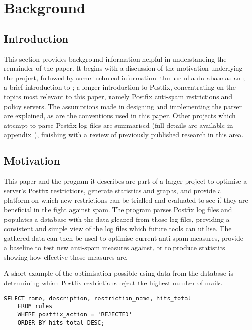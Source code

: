 \section{Background}

\label{background}

\subsection{Introduction}

This section provides background information helpful in understanding the
remainder of the paper.  It begins with a discussion of the motivation
underlying the project, followed by some technical information: the use of
a database as an \API{}\@; a brief introduction to \SMTP{}\@; a longer
introduction to Postfix, concentrating on the topics most relevant to this
paper, namely Postfix anti-spam restrictions and policy servers.  The
assumptions made in designing and implementing the parser are explained, as
are the conventions used in this paper.  Other projects which attempt to
parse Postfix log files are summarised (full details are available in
appendix~), finishing with a review of
previously published research in this area.

\subsection{Motivation}

\label{motivation}

This paper and the program it describes are part of a larger project to
optimise a server's Postfix restrictions, generate statistics and graphs,
and provide a platform on which new restrictions can be trialled and
evaluated to see if they are beneficial in the fight against spam.  The
program parses Postfix log files and populates a database with the data
gleaned from those log files, providing a consistent and simple view of the
log files which future tools can utilise.  The gathered data can then be
used to optimise current anti-spam measures, provide a baseline to test new
anti-spam measures against, or to produce statistics showing how effective
those measures are.

A short example of the optimisation possible using data from the database
is determining which Postfix restrictions reject the highest number of
mails:

\begin{verbatim}
SELECT name, description, restriction_name, hits_total
    FROM rules
    WHERE postfix_action = 'REJECTED'
    ORDER BY hits_total DESC;
\end{verbatim}

